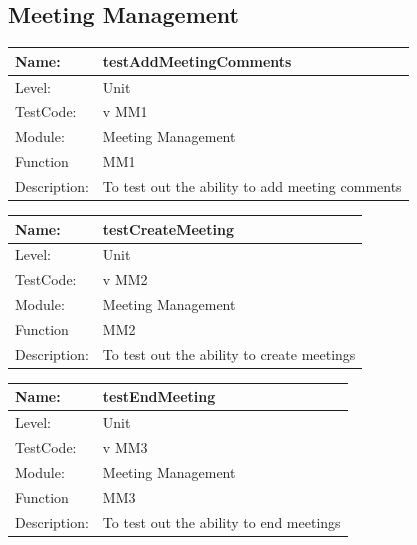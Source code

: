 \documentclass[12pt]{article}
\begin{document}
\subsection{Meeting Management}
\begin{center}
\begin{tabular}{|l|p{12cm}|}
\hline

 Name: & testAddMeetingComments  \\
\hline
Level: & Unit \\
\hline
TestCode: & v MM1 \\
\hline
Module:& Meeting Management \\
\hline
Function & MM1 \\
\hline
Description: & To test out the ability to add meeting comments  \\
\hline

\end{tabular}
\end{center}

\begin{center}
\begin{tabular}{|l|p{12cm}|}
\hline

 Name: & testCreateMeeting  \\
\hline
Level: & Unit \\
\hline
TestCode: & v MM2 \\
\hline
Module:& Meeting Management \\
\hline
Function & MM2 \\
\hline
Description: & To test out the ability to create meetings \\
\hline

\end{tabular}
\end{center}

\begin{center}
\begin{tabular}{|l|p{12cm}|}
\hline

 Name: & testEndMeeting  \\
\hline
Level: & Unit \\
\hline
TestCode: & v MM3 \\
\hline
Module:& Meeting Management \\
\hline
Function & MM3 \\
\hline
Description: & To test out the ability to end meetings   \\
\hline

\end{tabular}
\end{center}
\end{document}
